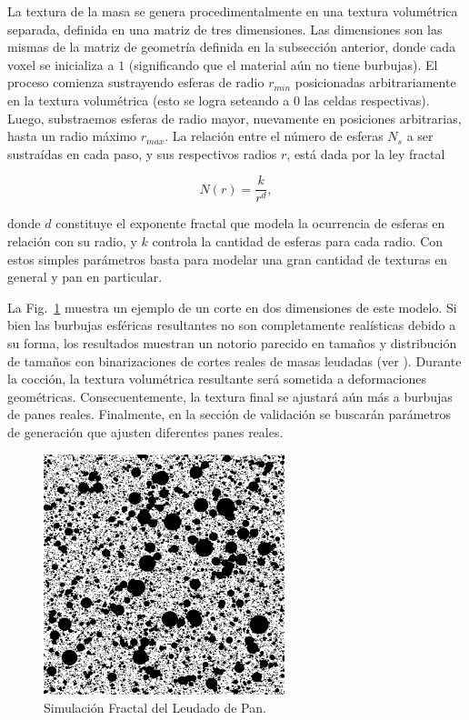 La textura de la masa se genera procedimentalmente en una textura volumétrica separada, definida en una matriz de tres dimensiones.
Las dimensiones son las mismas de la matriz de geometría definida en la subsección anterior, donde cada voxel se inicializa a $1$ (significando que el material aún no tiene burbujas).
El proceso comienza sustrayendo esferas de radio $r_{min}$ posicionadas arbitrariamente en la textura volumétrica (esto se logra seteando a $0$ las celdas respectivas).
Luego, substraemos esferas de radio mayor, nuevamente en posiciones arbitrarias, hasta un radio máximo $r_{max}$.
La relación entre el número de esferas $N_{s}$ a ser sustraídas en cada paso, y sus respectivos radios $r$, está dada por la ley fractal


\begin{equation*}
N(r) = \frac{k}{r^{d}},
\end{equation*}

\noindent donde $d$ constituye el exponente fractal que modela la ocurrencia de esferas en relación con su radio, y $k$ controla la cantidad de esferas para cada radio.
Con estos simples parámetros basta para modelar una gran cantidad de texturas en general y pan en particular.

La Fig.~\ref{FigProving} muestra un ejemplo de un corte en dos dimensiones de este modelo.
Si bien las burbujas esféricas resultantes no son completamente realísticas debido a su forma, los resultados muestran un notorio parecido en tamaños y distribución de tamaños con binarizaciones de cortes reales de masas leudadas (ver \cite{Babin2006}).
Durante la cocción, la textura volumétrica resultante será sometida a deformaciones geométricas. Consecuentemente, la textura final se ajustará aún más a burbujas de panes reales.
Finalmente, en la sección de validación se buscarán parámetros de generación que ajusten diferentes panes reales. 

\begin{figure}
\center
\includegraphics[width=7cm]{figures/bubbles}
\caption{Simulación Fractal del Leudado de Pan.}
\label{FigProving}
\end{figure}

